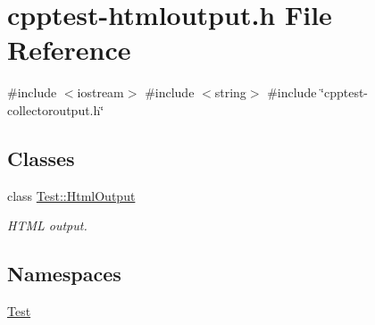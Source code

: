 \hypertarget{cpptest-htmloutput_8h}{}\section{cpptest-\/htmloutput.h File Reference}
\label{cpptest-htmloutput_8h}
{\ttfamily \#include $<$iostream$>$}\newline
{\ttfamily \#include $<$string$>$}\newline
{\ttfamily \#include \char`\"{}cpptest-\/collectoroutput.\+h\char`\"{}}\newline
\subsection*{Classes}
\begin{DoxyCompactItemize}
\item 
class \mbox{\hyperlink{class_test_1_1_html_output}{Test\+::\+Html\+Output}}
\begin{DoxyCompactList}\small\item\em H\+T\+ML output. \end{DoxyCompactList}\end{DoxyCompactItemize}
\subsection*{Namespaces}
\begin{DoxyCompactItemize}
\item 
 \mbox{\hyperlink{namespace_test}{Test}}
\end{DoxyCompactItemize}
